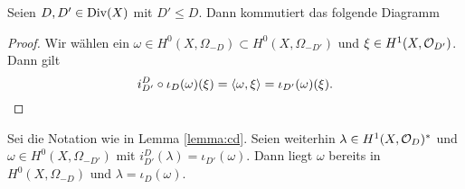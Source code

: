 \begin{lemma}
  \label{lemma:cd}
  Seien $D, D' \in \operatorname{Div}(X)$ mit $D' \leq D$. Dann kommutiert das
  folgende Diagramm
  \begin{center}
  \end{center}
\end{lemma}

\begin{proof}
  Wir wählen ein $\omega \in H^0(X, \Omega_{-D}) \subset H^0(X,
  \Omega_{-D'})$ und $\xi \in H^1(X, \mathcal{O}_{D'})$. Dann gilt
  \[
  i_{D'}^D \circ \iota_D(\omega)(\xi) = \langle \omega, \xi \rangle =
  \iota_{D'}(\omega)(\xi).
  \]
\end{proof}

\begin{lemma}
  \label{lemma:urbilder}
  Sei die Notation wie in Lemma \ref{lemma:cd}. Seien weiterhin
  $\lambda \in H^1(X, \mathcal{O}_D)^\ast$ und $\omega \in H^0(X,
  \Omega_{-D'})$ mit $i_{D'}^D(\lambda) = \iota_{D'}(\omega)$. Dann
  liegt $\omega$ bereits in $H^0(X, \Omega_{-D})$ und $\lambda =
  \iota_D (\omega)$.
\end{lemma}

